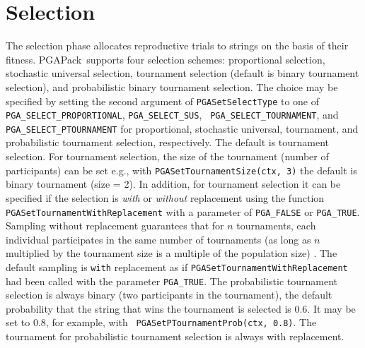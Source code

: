 \documentclass{report}
\newcommand{\pga}{PGAPack}
\begin{document}
\section{Selection}\label{sec:selection}

The selection phase allocates reproductive trials to strings on the basis of
their fitness.  \pga\ supports four selection schemes: proportional selection,
stochastic universal selection, tournament selection (default is binary
tournament selection), and probabilistic
binary tournament selection.  The choice may be specified by setting the
second argument of {\tt PGASetSelectType} to one of {\tt
PGA\_SELECT\_PROPORTIONAL}, {\tt PGA\_SELECT\_SUS}, {\tt
PGA\_SELECT\_TOURNAMENT}, and {\tt PGA\_SELECT\_PTOURNAMENT} for proportional,
stochastic universal, tournament, and probabilistic tournament selection,
respectively.  The default is tournament selection. For tournament
selection, the size of the tournament (number of participants) can be
set e.g., with \verb+PGASetTournamentSize(ctx, 3)+ the default is binary
tournament (size = 2). In addition, for tournament selection it can be
specified if the selection is \textit{with} or \textit{without}
replacement using the function \verb+PGASetTournamentWithReplacement+ with
a parameter of \verb+PGA_FALSE+ or \verb+PGA_TRUE+. Sampling without
replacement guarantees that for $n$ tournaments, each individual
participates in the same number of tournaments (as long as $n$
multiplied by the tournament size is a multiple of the population size)
\cite{GKD89}.  The default sampling is
\texttt{with} replacement as if \verb+PGASetTournamentWithReplacement+
had been called with the parameter \verb+PGA_TRUE+.  The probabilistic
tournament selection is always binary (two participants in the
tournament), the default probability that the string that wins the
tournament is selected is 0.6.  It may be set to 0.8, for example, with {\tt
PGASetPTournamentProb(ctx, 0.8)}. The tournament for probabilistic
tournament selection is always with replacement.
\end{document}
